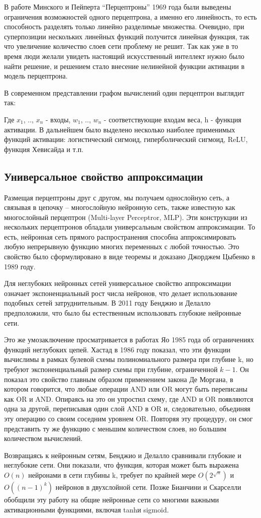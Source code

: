 \par
В работе Минского и Пейперта “Перцептроны” 1969 года были выведены ограничения возможностей одного перцептрона, а именно его линейность, то есть способность разделять только линейно разделимые множества. Очевидно, при суперпозиции нескольких линейных функций получится линейная функция, так что увеличение количество слоев сети проблему не решит. Так как уже в то время люди желали увидеть настоящий искусственный интеллект нужно было найти решение, и решением стало внесение нелинейной функции активации в модель перцептрона.
\par
В современном представлении графом вычислений один перцептрон выглядит так:
 
Где $x_1$, .., $x_n$ - входы, $w_1$, .., $w_n$ - соответствующие входам веса, h - функция активации. В дальнейшем было выделено несколько наиболее применимых функций активации: логистический сигмоид, гиперболический сигмоид, ReLU, функция Хевисайда и т.п.
\subsection{Универсальное свойство аппроксимации}
Размещая перцептроны друг с другом, мы получаем однослойную сеть, а связывая в цепочку – многослойную нейронную сеть, также известную как многослойный перцептрон (Multi-layer Perceptror, MLP). Эти конструкции из нескольких перцептронов обладали универсальным свойством аппроксимации. То есть, нейронная сеть прямого распространения способна аппроксимировать любую непрерывную функцию многих переменных с любой точностью. Это свойство было сформулировано в виде теоремы и доказано  Джорджем Цыбенко в 1989 году.
\par
Для неглубоких нейронных сетей универсальное свойство аппроксимации означает экспоненциальный рост числа нейронов, что делает использование подобных сетей затруднительным. В 2011 году Бенджио и Делалло  предположили, что было бы естественным использовать глубокие нейронные сети. 
\par
Это же умозаключение просматривается в работах Яо 1985 года об ограничениях функций неглубоких цепей. Хастад в 1986 году показал, что эти функции вычислимы в рамках булевой схемы полиномиального размера      при глубине k, но требуют экспоненциальный размер схемы при глубине, ограниченной $k-1$. Он показал это свойство главным образом применением закона Де Моргана, в котором говорится, что любые операции AND или OR могут быть переписаны как OR и AND. Опираясь на это он упростил схему, где AND и OR появляются одна за другой, переписывая один слой AND в OR и, следовательно, объединяя эту операцию со своим соседним уровнем OR. Повторяя эту процедуру, он смог представить ту же функцию с меньшим количеством слоев, но большим количеством вычислений.
\par
Возвращаясь к нейронным сетям, Бенджио и Делалло сравнивали глубокие и неглубокие сети. Они показали, что функция, которая может быть выражена $O(n)$ нейронами в сети глубины k, требует по крайней мере $O(2^{\sqrt{n}})$ и $O((n-1)^k)$ нейронов в двухслойной сети. Позже Бианчини и Скарселли обобщили эту работу на общие нейронные сети со многими важными активационными функциями, включая tanhи sigmoid.
